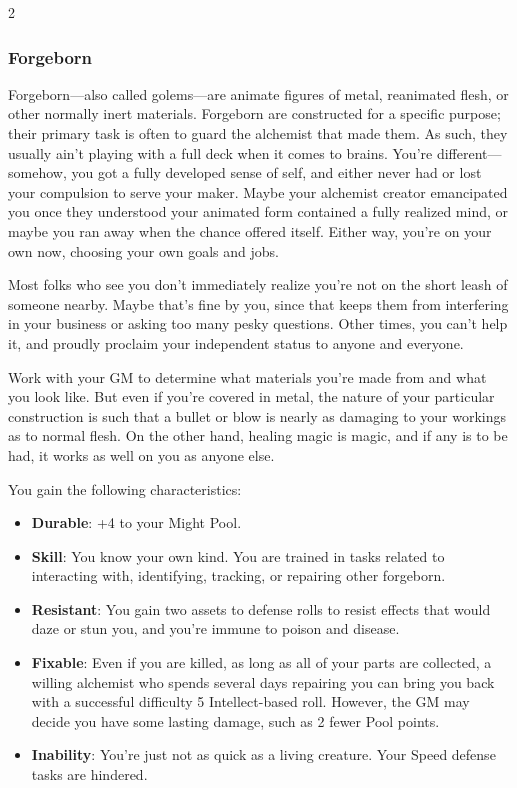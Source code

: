 \begin{multicols}{2}
\subsubsection{Forgeborn}

Forgeborn—also called golems—are animate figures of metal, reanimated flesh, or other normally inert materials. Forgeborn are constructed for a specific purpose; their primary task is often to guard the alchemist that made them. As such, they usually ain’t playing with a full deck when it comes to brains. You’re different—somehow, you got a fully developed sense of self, and either never had or lost your compulsion to serve your maker. Maybe your alchemist creator emancipated you once they understood your animated form contained a fully realized mind, or maybe you ran away when the chance offered itself. Either way, you’re on your own now, choosing your own goals and jobs. 

Most folks who see you don’t immediately realize you’re not on the short leash of someone nearby. Maybe that’s fine by you, since that keeps them from interfering in your business or asking too many pesky questions. Other times, you can’t help it, and proudly proclaim your independent status to anyone and everyone. 

Work with your GM to determine what materials you’re made from and what you look like. But even if you’re covered in metal, the nature of your particular construction is such that a bullet or blow is nearly as damaging to your workings as to normal flesh. On the other hand, healing magic is magic, and if any is to be had, it works as well on you as anyone else.

You gain the following characteristics: 

\begin{itemize}
\item \textbf{Durable}: +4 to your Might Pool. 
\item \textbf{Skill}: You know your own kind. You are trained in tasks related to interacting with, identifying, tracking, or repairing other forgeborn. 
\item \textbf{Resistant}: You gain two assets to defense rolls to resist effects that would daze or stun you, and you’re immune to poison and disease. 
\item \textbf{Fixable}: Even if you are killed, as long as all of your parts are collected, a willing alchemist who spends several days repairing you can bring you back with a successful difficulty 5 Intellect-based roll. However, the GM may decide you have some lasting damage, such as 2 fewer Pool points. 
\item \textbf{Inability}: You’re just not as quick as a living creature. Your Speed defense tasks are hindered. 
\end{itemize}


\end{multicols}
